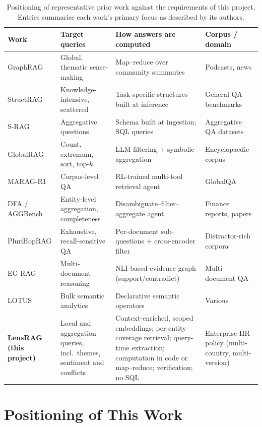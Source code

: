 \documentclass[11pt,letterpaper,oneside]{report}
\begin{document}
\begin{table}[htbp]
\centering\small
\caption{Positioning of representative prior work against the requirements
of this project. Entries summarise each work's primary focus as described by
its authors.}
\label{tab:gap}
\begin{tabularx}{\textwidth}{@{}l X X X@{}}
\toprule
\textbf{Work} & \textbf{Target queries} & \textbf{How answers are computed} & \textbf{Corpus / domain} \\
\midrule
GraphRAG \citep{edge2024graphrag} & Global, thematic sense-making & Map--reduce over community summaries & Podcasts, news \\
StructRAG \citep{li2025structrag} & Knowledge-intensive, scattered & Task-specific structures built at inference & General QA benchmarks \\
S-RAG \citep{koshorek2025srag} & Aggregative questions & Schema built at ingestion; SQL queries & Aggregative QA datasets \\
GlobalRAG \citep{luo2025globalrag} & Count, extremum, sort, top-$k$ & LLM filtering + symbolic aggregation & Encyclopaedic corpus \\
MARAG-R1 \citep{luo2025maragr1} & Corpus-level QA & RL-trained multi-tool retrieval agent & GlobalQA \\
DFA / AGGBench \citep{zhu2026aggbench} & Entity-level aggregation, completeness & Disambiguate--filter--aggregate agent & Finance reports, papers \\
PluriHopRAG \citep{sveistrys2025plurihop} & Exhaustive, recall-sensitive QA & Per-document sub-questions + cross-encoder filter & Distractor-rich corpora \\
EG-RAG \citep{hong2026egrag} & Multi-document reasoning & NLI-based evidence graph (support/contradict) & Multi-document QA \\
LOTUS \citep{patel2025lotus} & Bulk semantic analytics & Declarative semantic operators & Various \\
\midrule
\textbf{LensRAG (this project)} & Local and aggregation queries, incl.\ themes, sentiment and conflicts & Context-enriched, scoped embeddings; per-entity coverage retrieval; query-time extraction; computation in code or map--reduce; verification; no SQL & Enterprise HR policy (multi-country, multi-version) \\
\bottomrule
\end{tabularx}
\end{table}

\section{Positioning of This Work}
\label{sec:positioning}
\end{document}
